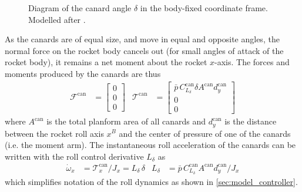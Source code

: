 \begin{figure}[ht]
    \centering
    \resizebox{0.6\textwidth}{!}{
    }
    \caption[Diagram of the canard angle]{Diagram of the canard angle $\delta$ in the body-fixed coordinate frame. Modelled after \cite{siouris2004}.}
    \label{fig:model_delta}
\end{figure}

As the canards are of equal size, and move in equal and opposite angles, the normal force on the rocket body cancels out (for small angles of attack of the rocket body), it remains a net moment about the rocket $x$-axis.
The forces and moments produced by the canards are thus 
\begin{align}
    \mathcal{F}^\text{can} &= \begin{bmatrix} 0 \\ 0 \\ 0 \end{bmatrix}
    & 
    \mathcal{T}^\text{can} &= \begin{bmatrix} \bar p \, C^\text{can}_{L_\delta} \delta A^\text{can} d^\text{can}_y 
    \\ 0 \\ 0 \end{bmatrix} \label{eq:model-aero-canards}
\end{align}
where $A^\text{can}$ is the total planform area of all canards and $d^\text{can}_y$ is the distance between the rocket roll axis $x^B$ and the center of pressure of one of the canards (i.e. the moment arm).
The instantaneous roll acceleration of the canards can be written with the roll control derivative $L_\delta$ as 
\begin{align}
    \dot \omega_x &= \mathcal{T}^\text{can}_x / J_x = L_\delta \, \delta
    & 
    L_\delta &= \bar p \, C^\text{can}_{L_\delta} A^\text{can} d^\text{can}_y / J_x
\end{align}
which simplifies notation of the roll dynamics as shown in \autoref{sec:model_controller}.


